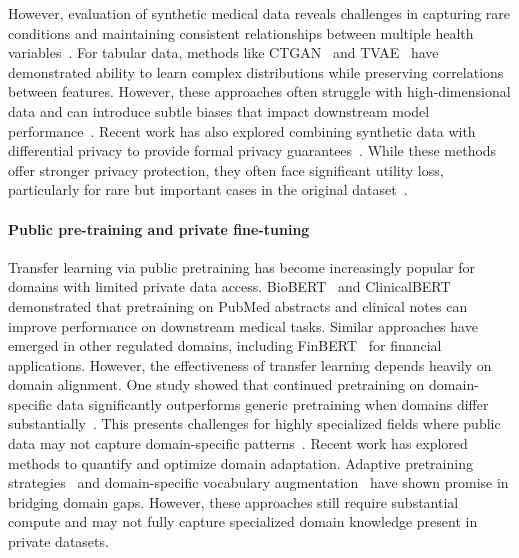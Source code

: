 However, evaluation of synthetic medical data reveals challenges in capturing rare conditions and maintaining consistent relationships between multiple health variables~\cite{goncalves2020generation}. For tabular data, methods like CTGAN~\cite{xu2019modeling} and TVAE~\cite{xu2019modeling} have demonstrated ability to learn complex distributions while preserving correlations between features. However, these approaches often struggle with high-dimensional data and can introduce subtle biases that impact downstream model performance~\cite{assefa2020generating}. Recent work has also explored combining synthetic data with differential privacy to provide formal privacy guarantees~\cite{jordon2018pate}. While these methods offer stronger privacy protection, they often face significant utility loss, particularly for rare but important cases in the original dataset~\cite{yang2024tabular}.

\paragraph{Public pre-training and private fine-tuning}

Transfer learning via public pretraining has become increasingly popular for domains with limited private data access. BioBERT~\cite{lee2020biobert} and ClinicalBERT~\cite{alsentzer2019publicly} demonstrated that pretraining on PubMed abstracts and clinical notes can improve performance on downstream medical tasks. Similar approaches have emerged in other regulated domains, including FinBERT~\cite{liu2021finbert} for financial applications.
However, the effectiveness of transfer learning depends heavily on domain alignment. One study showed that continued pretraining on domain-specific data significantly outperforms generic pretraining when domains differ substantially~\cite{gururangan2020don}. This presents challenges for highly specialized fields where public data may not capture domain-specific patterns~\cite{le2022language}.
Recent work has explored methods to quantify and optimize domain adaptation. Adaptive pretraining strategies~\cite{howard2018universal} and domain-specific vocabulary augmentation~\cite{gururangan2020don} have shown promise in bridging domain gaps. However, these approaches still require substantial compute and may not fully capture specialized domain knowledge present in private datasets.


